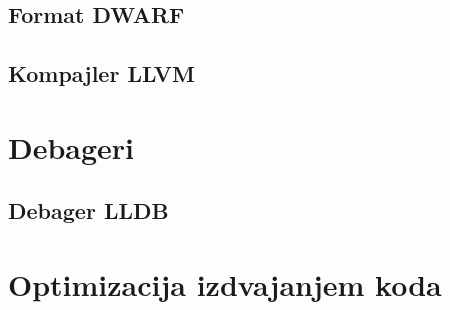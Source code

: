 \documentclass[12pt,oneside]{memoir}
\begin{document}
\section{Format DWARF}



\section{Kompajler LLVM}


\chapter{Debageri}





\section{Debager LLDB}

\chapter{Optimizacija izdvajanjem koda}

\end{document}
